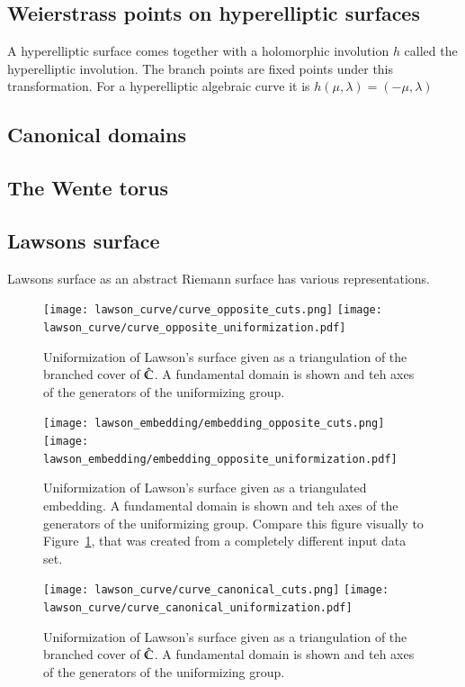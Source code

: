 \documentclass[Thesis.tex]{subfiles}
\begin{document}
\subsection{Weierstrass points on hyperelliptic surfaces}
A hyperelliptic surface comes together with a holomorphic involution $h$ called the hyperelliptic involution. The branch points are fixed points under this transformation. For a hyperelliptic algebraic curve it is $h(\mu, \lambda)=(-\mu, \lambda)$

\subsection{Canonical domains}
\subsection{The Wente torus}
\subsection{Lawsons surface}

Lawsons surface as an abstract Riemann surface has various representations. 

\begin{figure}
	\centering
	\texttt{[image: lawson\_curve/curve\_opposite\_cuts.png]}
	\texttt{[image: lawson\_curve/curve\_opposite\_uniformization.pdf]}
	\caption{Uniformization of Lawson's surface given as a triangulation
of the branched cover of $\hat{\mathbb C}$. A fundamental domain is shown and
teh axes of the generators of the uniformizing group.}
	\label{fig:lawson_curve_opposite}
\end{figure}


\begin{figure}
	\centering
	\texttt{[image: lawson\_embedding/embedding\_opposite\_cuts.png]}
	\texttt{[image: lawson\_embedding/embedding\_opposite\_uniformization.pdf]}
	\caption{Uniformization of Lawson's surface given as a triangulated embedding. A fundamental domain is shown and
teh axes of the generators of the uniformizing group. Compare this figure visually to Figure~\ref{fig:lawson_curve_opposite}, that was created from a 
completely different input data set.}
	\label{fig:lawson_embedding_opposite}
\end{figure}

\begin{figure}
	\centering
	\texttt{[image: lawson\_curve/curve\_canonical\_cuts.png]}
	\texttt{[image: lawson\_curve/curve\_canonical\_uniformization.pdf]}
	\caption{Uniformization of Lawson's surface given as a triangulation
of the branched cover of $\hat{\mathbb C}$. A fundamental domain is shown and
teh axes of the generators of the uniformizing group.}
	\label{fig:lawson_curve_canonical}
\end{figure}
\end{document}
